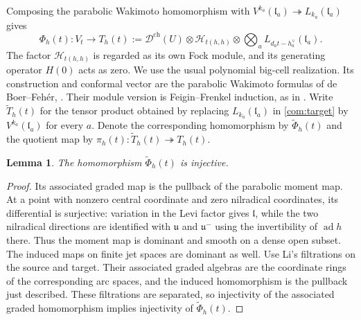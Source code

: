 \documentclass[11pt,a4paper]{amsart}
\numberwithin{equation}{section}
\newtheorem{lemma}[theorem]{Lemma}
\theoremstyle{definition}
\theoremstyle{remark}
\newcommand{\uu}{\mathfrak u}
\newcommand{\lev}{\mathfrak l}
\newcommand{\ad}{\operatorname{ad}}
\begin{document}
Composing the parabolic Wakimoto homomorphism with
$V^{k_a}(\lev_a)\twoheadrightarrow L_{k_a}(\lev_a)$ gives
\begin{equation}\label{com:target}
 \Phi_h(t):V_t\longrightarrow T_h(t):=
 \mathcal D^{\mathrm{ch}}(U)\otimes
 \mathcal H_{t(h,h)}\otimes
 \bigotimes_a L_{d_at-h_a^\vee}(\lev_a).
\end{equation}
The factor $\mathcal H_{t(h,h)}$ is regarded as its own Fock
module, and its generating operator $H(0)$ acts as zero. We use the usual
polynomial big-cell realization. Its construction and conformal vector
are the parabolic Wakimoto formulas of de Boer--Feh\'er,
\cite[Theorem~3]{dBF}. Their module version is Feigin--Frenkel
induction, as in \cite[Section~7.1, equation~(50)]{ABGG}.
Write $\widetilde T_h(t)$ for the tensor product obtained by replacing
$L_{k_a}(\lev_a)$ in \eqref{com:target} by $V^{k_a}(\lev_a)$ for every $a$. Denote the corresponding homomorphism by
$\widetilde\Phi_h(t)$ and the quotient map by
$\pi_h(t):\widetilde T_h(t)\twoheadrightarrow T_h(t)$.

\begin{lemma}\label{com:universal-parabolic-injective}
The homomorphism $\widetilde\Phi_h(t)$ is injective.
\end{lemma}
\begin{proof}
Its associated graded map is the pullback of the parabolic moment map.
At a point with nonzero central coordinate and zero nilradical
coordinates, its differential is surjective: variation in the Levi
factor gives $\lev$, while the two nilradical directions are identified
with $\uu$ and $\uu^-$ using the invertibility of $\ad h$ there.
Thus the moment map is dominant and smooth on a dense open subset.
The induced maps on finite jet spaces are dominant as well.
Use Li's filtrations on the source and target. Their associated
graded algebras are the coordinate rings of the corresponding arc
spaces, and the induced homomorphism is the pullback just described.
These filtrations are separated, so injectivity of the associated
graded homomorphism implies injectivity of $\widetilde\Phi_h(t)$.
\end{proof}
\end{document}
